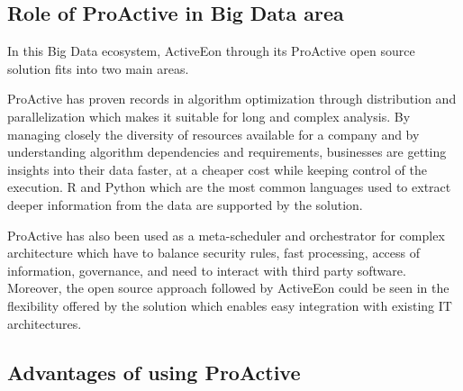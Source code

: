 \documentclass[	DIV=calc,%
							paper=a4,%
							fontsize=11pt,%
							twocolumn]{scrartcl}	 					%
\begin{document}
\subsection*{Role of ProActive in Big Data area}

In this Big Data ecosystem, ActiveEon through its ProActive \cite{ProActive} open source solution fits into two main areas.

ProActive has proven records in algorithm optimization through distribution and parallelization which makes it suitable for long and complex analysis. By managing closely the diversity of resources available for a company and by understanding algorithm dependencies and requirements, businesses are getting insights into their data faster, at a cheaper cost while keeping control of the execution. R and Python which are the most common languages used to extract deeper information from the data are supported by the solution. 

ProActive has also been used as a meta-scheduler and orchestrator for complex architecture which have to balance security rules, fast processing, access of information, governance, and need to interact with third party software. Moreover, the open source approach followed by ActiveEon could be seen in the flexibility offered by the solution which enables easy integration with existing IT architectures.


\subsection*{Advantages of using ProActive}



\end{document}
